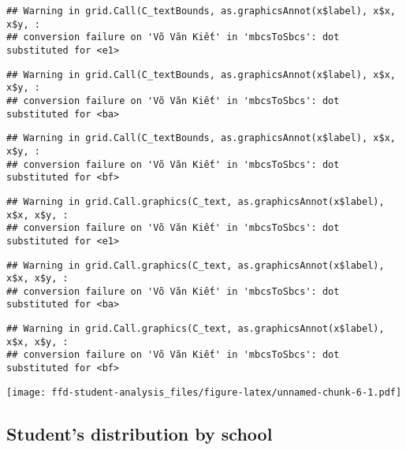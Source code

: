 \documentclass[
]{article}
\begin{document}
\begin{verbatim}
## Warning in grid.Call(C_textBounds, as.graphicsAnnot(x$label), x$x, x$y, :
## conversion failure on 'Võ Văn Kiết' in 'mbcsToSbcs': dot substituted for <e1>
\end{verbatim}

\begin{verbatim}
## Warning in grid.Call(C_textBounds, as.graphicsAnnot(x$label), x$x, x$y, :
## conversion failure on 'Võ Văn Kiết' in 'mbcsToSbcs': dot substituted for <ba>
\end{verbatim}

\begin{verbatim}
## Warning in grid.Call(C_textBounds, as.graphicsAnnot(x$label), x$x, x$y, :
## conversion failure on 'Võ Văn Kiết' in 'mbcsToSbcs': dot substituted for <bf>
\end{verbatim}

\begin{verbatim}
## Warning in grid.Call.graphics(C_text, as.graphicsAnnot(x$label), x$x, x$y, :
## conversion failure on 'Võ Văn Kiết' in 'mbcsToSbcs': dot substituted for <e1>
\end{verbatim}

\begin{verbatim}
## Warning in grid.Call.graphics(C_text, as.graphicsAnnot(x$label), x$x, x$y, :
## conversion failure on 'Võ Văn Kiết' in 'mbcsToSbcs': dot substituted for <ba>
\end{verbatim}

\begin{verbatim}
## Warning in grid.Call.graphics(C_text, as.graphicsAnnot(x$label), x$x, x$y, :
## conversion failure on 'Võ Văn Kiết' in 'mbcsToSbcs': dot substituted for <bf>
\end{verbatim}

\texttt{[image: ffd-student-analysis\_files/figure-latex/unnamed-chunk-6-1.pdf]}

\hypertarget{students-distribution-by-school}{%
\subsection{Student's distribution by
school}\label{students-distribution-by-school}}
\end{document}
